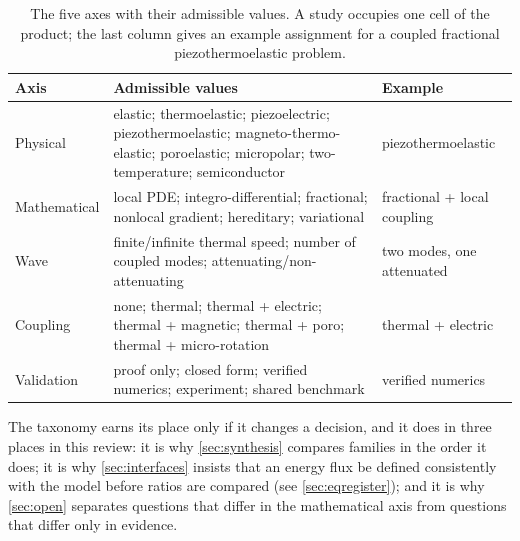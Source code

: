 \begin{table}[H]\centering\small
\caption{The five axes with their admissible values. A study occupies one cell of the product; the last
column gives an example assignment for a coupled fractional piezothermoelastic problem.}
\label{tab:taxonomy-axes}
\begin{tabularx}{\textwidth}{@{}p{1.6cm}Y Y@{}}
\toprule
\textbf{Axis} & \textbf{Admissible values} & \textbf{Example} \\
\midrule
Physical & elastic; thermoelastic; piezoelectric; piezothermoelastic; magneto-thermo-elastic; poroelastic;
  micropolar; two-temperature; semiconductor & piezothermoelastic \\
Mathematical & local PDE; integro-differential; fractional; nonlocal gradient; hereditary; variational &
  fractional + local coupling \\
Wave & finite/infinite thermal speed; number of coupled modes; attenuating/non-attenuating &
  two modes, one attenuated \\
Coupling & none; thermal; thermal + electric; thermal + magnetic; thermal + poro; thermal + micro-rotation &
  thermal + electric \\
Validation & proof only; closed form; verified numerics; experiment; shared benchmark &
  verified numerics \\
\bottomrule
\end{tabularx}
\end{table}

The taxonomy earns its place only if it changes a decision, and it does in three places in this review: it
is why \cref{sec:synthesis} compares families in the order it does; it is why \cref{sec:interfaces} insists
that an energy flux be defined consistently with the model before ratios are compared (see
\cref{sec:eqregister}); and it is why \cref{sec:open} separates questions that differ in the mathematical
axis from questions that differ only in evidence.
